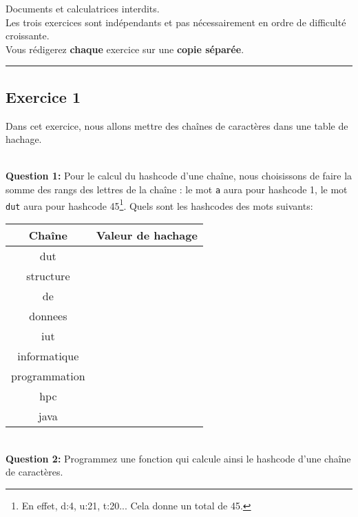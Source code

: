 \documentclass[iutinfo,10pt]{ustl-tdtp}
\date{\annee{2017}--\annee{2018}}
\begin{document}
\maketitle
\thispagestyle{empty}

\begin{center}
  Documents et calculatrices interdits. \\
  Les trois exercices sont indépendants et pas nécessairement en ordre de difficulté croissante. \\
  Vous rédigerez \textbf{chaque} exercice sur une \textbf{copie séparée}.
\end{center}
\hrule

\begin{center}


\end{center}

\subsection*{Exercice 1}

Dans cet exercice, nous allons mettre des chaînes de caractères dans une table de hachage.

~\\ \textbf{Question 1:} Pour le calcul du hashcode d'une chaîne, nous choisissons de faire la somme des rangs des lettres de la chaîne : le mot \texttt{a} aura pour hashcode 1, le mot \texttt{dut} aura pour hashcode 45\footnote{En effet, d:4, u:21, t:20... Cela donne un total de 45.}. Quels sont les hashcodes des mots suivants:
\begin{center}
\begin{tabular}{|c|c|}
\hline
Chaîne & Valeur de hachage\\
\hline 
dut & \\
structure &  \\
de &  \\
donnees &  \\
iut &  \\
informatique &  \\
programmation &  \\
hpc & \\
java &  \\
\hline
\end{tabular}
\end{center}

~\\ \textbf{Question 2:} Programmez une fonction qui calcule ainsi le hashcode d'une chaîne de caractères.
\end{document}
